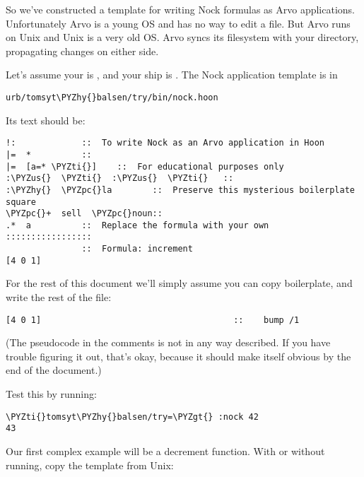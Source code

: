 So we've constructed a template for writing Nock formulas as Arvo
applications.  Unfortunately Arvo is a young OS and has no way to
edit a file.  But Arvo runs on Unix and Unix is a very old OS.
Arvo syncs its filesystem with your  directory,
propagating changes on either side.

Let's assume your  is , and your ship is
.  The Nock application template is in

\begin{framed_shaded}
\begin{Verbatim}[fontsize=\relsize{-2.5},fontseries=b,commandchars=\\\{\}]
urb/tomsyt\PYZhy{}balsen/try/bin/nock.hoon
\end{Verbatim}
\end{framed_shaded}
Its text should be:

\begin{framed_shaded}
\begin{Verbatim}[fontsize=\relsize{-2.5},fontseries=b,commandchars=\\\{\}]
!:             ::  To write Nock as an Arvo application in Hoon
|=  *          ::
|=  [a=* \PYZti{}]    ::  For educational purposes only
:\PYZus{}  \PYZti{}  :\PYZus{}  \PYZti{}   ::
:\PYZhy{}  \PYZpc{}la        ::  Preserve this mysterious boilerplate square
\PYZpc{}+  sell  \PYZpc{}noun::
.*  a          ::  Replace the formula with your own
:::::::::::::::::
               ::  Formula: increment
[4 0 1]
\end{Verbatim}
\end{framed_shaded}
For the rest of this document we'll simply assume you can copy
boilerplate, and write the rest of the file:

\begin{framed_shaded}
\begin{Verbatim}[fontsize=\relsize{-2.5},fontseries=b,commandchars=\\\{\}]
[4 0 1]                                      ::    bump /1
\end{Verbatim}
\end{framed_shaded}
(The pseudocode in the comments is not in any way described.  If
you have trouble figuring it out, that's okay, because it should
make itself obvious by the end of the document.)

Test this by running:

\begin{framed_shaded}
\begin{Verbatim}[fontsize=\relsize{-2.5},fontseries=b,commandchars=\\\{\}]
\PYZti{}tomsyt\PYZhy{}balsen/try=\PYZgt{} :nock 42
43
\end{Verbatim}
\end{framed_shaded}
Our first complex example will be a decrement function.  With or
without  running, copy the template from Unix:

